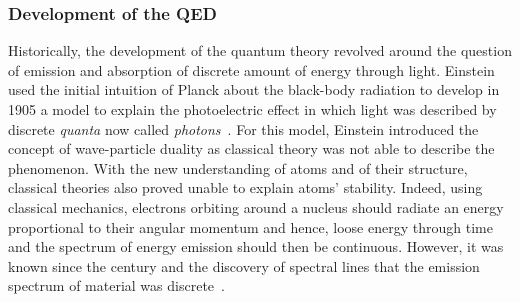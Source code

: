 	\subsubsection*{Development of the \acl{QED}}
	\label{chapt2:sssec:QED}
	
	Historically, the development of the quantum theory revolved around the question of emission and absorption of discrete amount of energy through light. Einstein used the initial intuition of Planck about the black-body radiation to develop in 1905 a model to explain the photoelectric effect in which light was described by discrete \textit{quanta} now called \textit{photons}~\cite{PLANK1900,EINSTEIN1905PHOTO}. For this model, Einstein introduced the concept of wave-particle duality as classical theory was not able to describe the phenomenon. With the new understanding of atoms and of their structure, classical theories also proved unable to explain atoms' stability. Indeed, using classical mechanics, electrons orbiting around a nucleus should radiate an energy proportional to their angular momentum and hence, loose energy through time and the spectrum of energy emission should then be continuous. However, it was known since the  century and the discovery of spectral lines that the emission spectrum of material was discrete~\cite{FRAUNHOFER1814}.
	
